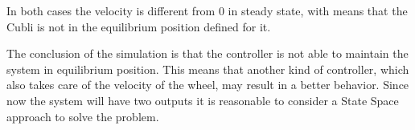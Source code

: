 In both cases the velocity is different from 0 in steady state, with means that the Cubli is not in the equilibrium position defined for it. 

The conclusion of the simulation is that the controller is not able to maintain the system in equilibrium position. This means that another kind of controller, which also takes care of the velocity of the wheel, may result in a better behavior. Since now the system will have two outputs it is reasonable to consider a State Space approach to solve the problem.

%
%
%
% 


